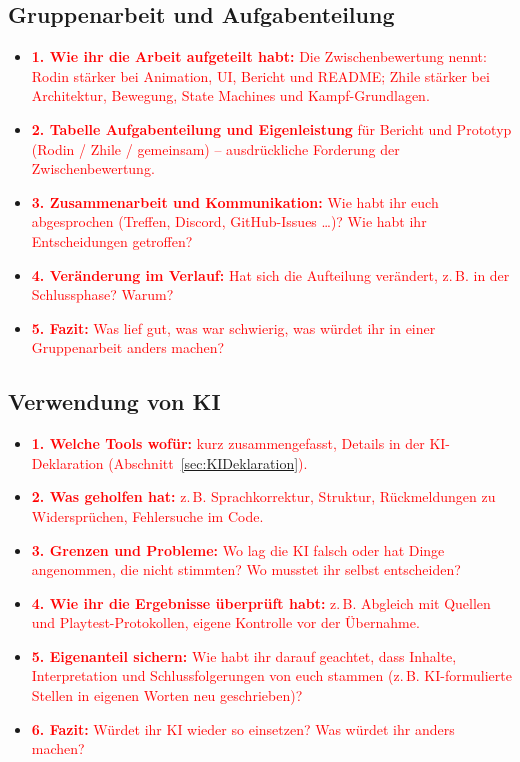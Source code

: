 \documentclass[../Main.tex]{subfiles}
\begin{document}
\subsection{Gruppenarbeit und Aufgabenteilung}

\begin{itemize}[leftmargin=1.5cm]
    \item \textcolor{red}{\textbf{1. Wie ihr die Arbeit aufgeteilt habt:} Die Zwischenbewertung nennt: Rodin stärker bei Animation, UI, Bericht und README; Zhile stärker bei Architektur, Bewegung, State Machines und Kampf-Grundlagen.}
    \item \textcolor{red}{\textbf{2. Tabelle Aufgabenteilung und Eigenleistung} für Bericht und Prototyp (Rodin / Zhile / gemeinsam) -- ausdrückliche Forderung der Zwischenbewertung.}
    \item \textcolor{red}{\textbf{3. Zusammenarbeit und Kommunikation:} Wie habt ihr euch abgesprochen (Treffen, Discord, GitHub-Issues \ldots)? Wie habt ihr Entscheidungen getroffen?}
    \item \textcolor{red}{\textbf{4. Veränderung im Verlauf:} Hat sich die Aufteilung verändert, z.\,B. in der Schlussphase? Warum?}
    \item \textcolor{red}{\textbf{5. Fazit:} Was lief gut, was war schwierig, was würdet ihr in einer Gruppenarbeit anders machen?}
\end{itemize}

\subsection{Verwendung von KI} \label{sec:ReflexionKI}

\begin{itemize}[leftmargin=1.5cm]
    \item \textcolor{red}{\textbf{1. Welche Tools wofür:} kurz zusammengefasst, Details in der KI-Deklaration (Abschnitt~\ref{sec:KIDeklaration}).}
    \item \textcolor{red}{\textbf{2. Was geholfen hat:} z.\,B. Sprachkorrektur, Struktur, Rückmeldungen zu Widersprüchen, Fehlersuche im Code.}
    \item \textcolor{red}{\textbf{3. Grenzen und Probleme:} Wo lag die KI falsch oder hat Dinge angenommen, die nicht stimmten? Wo musstet ihr selbst entscheiden?}
    \item \textcolor{red}{\textbf{4. Wie ihr die Ergebnisse überprüft habt:} z.\,B. Abgleich mit Quellen und Playtest-Protokollen, eigene Kontrolle vor der Übernahme.}
    \item \textcolor{red}{\textbf{5. Eigenanteil sichern:} Wie habt ihr darauf geachtet, dass Inhalte, Interpretation und Schlussfolgerungen von euch stammen (z.\,B. KI-formulierte Stellen in eigenen Worten neu geschrieben)?}
    \item \textcolor{red}{\textbf{6. Fazit:} Würdet ihr KI wieder so einsetzen? Was würdet ihr anders machen?}
\end{itemize}
\end{document}

